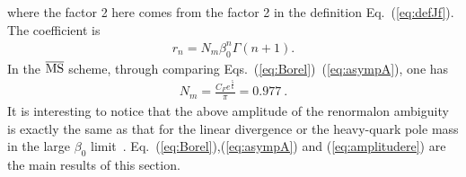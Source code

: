 \documentclass[a4paper,11pt]{article}
\begin{document}
where the factor 2 here comes from the factor 2 in the definition Eq.~(\ref{eq:defJf}). The coefficient is
\begin{align}\label{eq:asympA}
r_{n} = N_m \beta_0^n \Gamma(n+1).
\end{align}
In the $\overline {\rm MS}$ scheme, through comparing Eqs.~(\ref{eq:Borel})~(\ref{eq:asympA}), one has 
\begin{align}\label{eq:amplitudere}
N_m= \frac{C_Fe^{\frac{5}{6}}}{\pi} = 0.977 \ .
\end{align}
It is interesting to notice that the above amplitude of the renormalon ambiguity is exactly the same as that for the linear divergence or the heavy-quark pole mass in the large $\beta_0$ limit~\cite{Beneke:1994rs,Pineda:2001zq,Ayala:2014yxa}. Eq.~(\ref{eq:Borel}),(\ref{eq:asympA}) and (\ref{eq:amplitudere}) are the main results of this section. 
\end{document}
